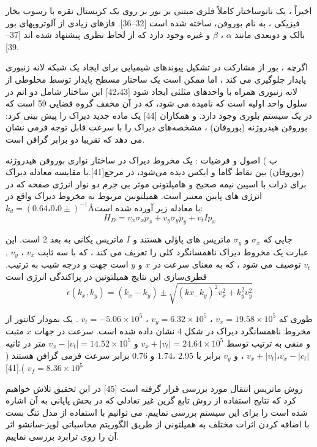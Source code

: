 اخیراً ، یک نانوساختار کاملاً فلزی مبتنی بر بور بر روی یک کریستال نقره با رسوب بخار فیزیکی ، به نام بوروفن، ساخته شده است [32–36]. فازهای زیادی از آلوتروپهای بور بالک و دوبعدی مانند $\alpha$ ، $\beta$ و غیره وجود دارد که از لحاظ نظری پیشنهاد شده اند [37–39]. 

اگرچه ، بور از مشارکت در تشکیل پیوندهای شیمیایی برای ایجاد یک شبکه لانه زنبوری پایدار جلوگیری می کند ، اما ممکن است یک ساختار مسطح پایدار توسط مخلوطی از لانه زنبوری همراه با واحدهای مثلثی ایجاد شود [42،43] این ساختار شامل دو اتم در سلول واحد اولیه است که  نامیده می شود، که در آن  مخفف گروه فضایی 59 است که در یک سیستم بلوری  وجود دارد.  و همکاران [44] یک ماده جدید دیراک را پیش بینی کرد: بوروفن هیدروژنه (بوروفان) ، مشخصه‌های دیراک را با سرعت قابل توجه فرمی نشان می دهد که تقریبا دو برابر گرافن است.

ب )  اصول و فرضيات :
یک مخروط دیراک در ساختار نواری بوروفن هیدروژنه (بوروفان) بین نقاط گاما و ایکس دیده می‌شود، در مرجع[41].با مقایسه معادله دیراک برای ذرات با اسپین نیمه صحیح و هامیلتونی موثر بی جرم دو نوار انرژی صفحه که در انرژی های پایین معتبر است. همیلتونین مربوط به مخروط دیراک واقع در $k_d = (0.64،0،0 ±)^{-1}$\AA با معادله زیر آورده شده است:
$$
H_D = v_x \sigma_x p_x + v_y \sigma_y p_y + v_t I p_x
$$

جایی که $\sigma_x$ و $\sigma_y$ ماتریس های پاؤلی هستند و $I$ ماتریس یکانی به بعد 2 است. این عبارت یک مخروط دیراک  ناهمسانگرد کلی را تعریف می کند ، که با سه ثابت $v_x$ ، $v_y$ , $v_t$ توصیف می شود ، که به معنای سرعت در $x$ و $y$ است جهت و درجه شیب به ترتیب. قطری‌سازی این نتایج همیلتونین در پراکندگی انرژی است
$$
\epsilon(k_x,k_y) = (k_x - k_y) \pm \sqrt{(kx_ -k_y)^2 v_x^2 + k_y^2 v_y^2}
$$

طوری که $v_x = 19.58\times 10^5$  ، $v_y = 6.32\times 10^5$  ، $v_t = -5.06\times 10^5$ . یک نمودار کانتور از مخروط ناهمسانگرد دیراک در شکل 4 نشان داده شده است. سرعت در جهات $x$ مثبت و منفی به ترتیب توسط $v_x + | v_t | = 24.64 \times 10^5$   و $v_x - | v_t | = 14.52 \times 10^5$ متر در ثانیه $v_x + | v_t | ، v_x - | c_t|$ ، و $v_y$ برابر با $2.95$ ،$ 1.74$ و $0.76$ برابر سرعت فرمی گرافن هستند ($v_f =8.36\times 10^5$  ).[41]

روش ماتریس انتقال مورد بررسی قرار گرفته است [45] در این تحقیق تلاش خواهیم کرد که نتایج استفاده از روش تابع گرین غیر تعادلی که در بخش پایانی به آن اشاره شده است را برای این سیستم بررسی نماییم. می توانیم با استفاده از مدل تنگ بست با اضافه کردن اثرات مختلف به همیلتونی از طریق الگوریتم محاسباتی لوپز-سانشو اثر آن را روی ترابرد بررسی نماییم.
